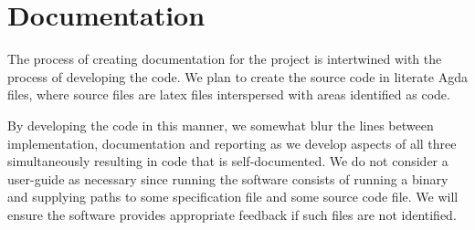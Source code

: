 \section{Documentation}

The process of creating documentation for the project is intertwined
with the process of developing the code. We plan to create the source
code in literate Agda files, where source files are latex
files interspersed with areas identified as code.

By developing the code in this manner, we somewhat blur the lines
between implementation, documentation and reporting as we develop
aspects of all three simultaneously resulting in code that is
self-documented. We do not consider a user-guide as necessary since running
the software consists of running a binary and supplying paths to some
specification file and some source code file. We will ensure the
software provides appropriate feedback if such files are not
identified.

